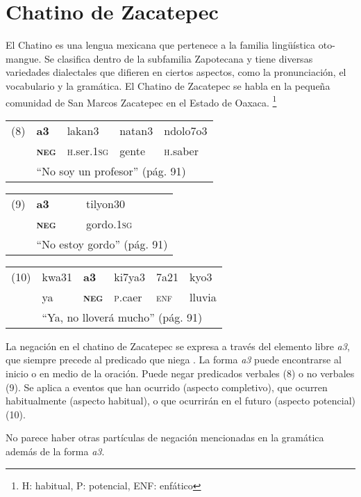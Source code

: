 \section*{Chatino de Zacatepec}

\noindent El Chatino es una lengua mexicana que pertenece a la familia lingüística oto-mangue. Se clasifica dentro de la subfamilia Zapotecana y tiene diversas variedades dialectales que difieren en ciertos aspectos, como la pronunciación, el vocabulario y la gramática. El Chatino de Zacatepec se habla en la pequeña comunidad de San Marcos Zacatepec en el Estado de Oaxaca. \vspace{1cm} %
\footnote{H: habitual, P: potencial, ENF: enfático}

{\setmainfont{Charis SIL}
\begin{tabular}{lllll}
(8) & \textbf{a3} & lakan3 & natan3 & ndolo7o3 \\
& \textsc{\textbf{neg}} & \textsc{h}.ser.\textsc{1sg} & gente & \textsc{h}.saber \\
& \multicolumn{4}{l}{“No soy un profesor” (pág. 91)}
\end{tabular} \vspace{0.5cm}

\begin{tabular}{lll}
(9) & \textbf{a3} & tilyon30 \\
& \textsc{\textbf{neg}} & gordo.\textsc{1sg} \\
& \multicolumn{2}{l}{“No estoy gordo” (pág. 91)} \\
\end{tabular} \vspace{0.5cm}

\begin{tabular}{llllll}
(10) & kwa31 & \textbf{a3} & ki7ya3 & 7a21 & kyo3 \\
& ya & \textsc{\textbf{neg}} & \textsc{p}.caer & \textsc{enf} & lluvia \\
& \multicolumn{5}{l}{“Ya, no lloverá mucho” (pág. 91)}                
\end{tabular} \vspace{1cm}
} 

 La negación en el chatino de Zacatepec se expresa a través del elemento libre {\setmainfont{Charis SIL} \textit{a3}}, que siempre precede al predicado que niega \textcolor{MidnightBlue}{\citet{chatino}}. La forma {\setmainfont{Charis SIL} \textit{a3}} puede encontrarse al inicio o en medio de la oración. Puede negar predicados verbales (8) o no verbales (9). Se aplica a eventos que han ocurrido (aspecto completivo), que ocurren habitualmente (aspecto habitual), o que ocurrirán en el futuro (aspecto potencial) (10).

No parece haber otras partículas de negación mencionadas en la gramática además de la forma {\setmainfont{Charis SIL} \textit{a3}}.